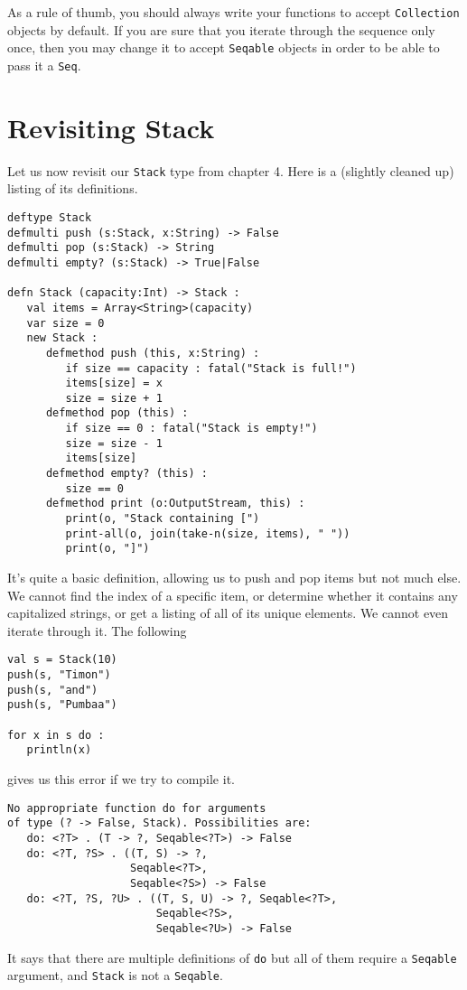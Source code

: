 \documentclass[10pt,oneside]{book}
\begin{document}
As a rule of thumb, you should always write your functions to accept \texttt{\frenchspacing Collection} objects by default. If you are sure that you iterate through the sequence only once, then you may change it to accept \texttt{\frenchspacing Seqable} objects in order to be able to pass it a \texttt{\frenchspacing Seq}.

\section{Revisiting Stack}
Let us now revisit our \texttt{\frenchspacing Stack} type from chapter 4. Here is a (slightly cleaned up) listing of its definitions.
\begin{lstlisting}
deftype Stack
defmulti push (s:Stack, x:String) -> False
defmulti pop (s:Stack) -> String
defmulti empty? (s:Stack) -> True|False

defn Stack (capacity:Int) -> Stack :
   val items = Array<String>(capacity)
   var size = 0
   new Stack :
      defmethod push (this, x:String) :
         if size == capacity : fatal("Stack is full!")
         items[size] = x
         size = size + 1
      defmethod pop (this) :
         if size == 0 : fatal("Stack is empty!")
         size = size - 1
         items[size]
      defmethod empty? (this) :
         size == 0
      defmethod print (o:OutputStream, this) :
         print(o, "Stack containing [")
         print-all(o, join(take-n(size, items), " "))
         print(o, "]")
\end{lstlisting}
It's quite a basic definition, allowing us to push and pop items but not much else. We cannot find the index of a specific item, or determine whether it contains any capitalized strings, or get a listing of all of its unique elements. We cannot even iterate through it. The following
\begin{lstlisting}
val s = Stack(10)
push(s, "Timon")
push(s, "and")
push(s, "Pumbaa")

for x in s do :
   println(x)
\end{lstlisting}
gives us this error if we try to compile it.
\begin{lstlisting}
No appropriate function do for arguments
of type (? -> False, Stack). Possibilities are:
   do: <?T> . (T -> ?, Seqable<?T>) -> False
   do: <?T, ?S> . ((T, S) -> ?,
                   Seqable<?T>,
                   Seqable<?S>) -> False
   do: <?T, ?S, ?U> . ((T, S, U) -> ?, Seqable<?T>,
                       Seqable<?S>,
                       Seqable<?U>) -> False
\end{lstlisting}
It says that there are multiple definitions of \texttt{\frenchspacing do} but all of them require a \texttt{\frenchspacing Seqable} argument, and \texttt{\frenchspacing Stack} is not a \texttt{\frenchspacing Seqable}.  
\end{document}
